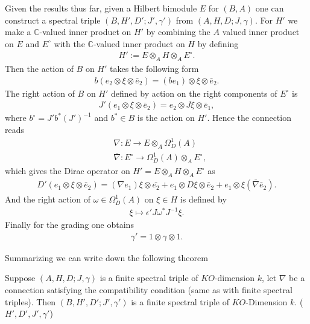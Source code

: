 Given the results thus far, given a Hilbert bimodule $E$ for $(B, A)$ one can
construct a spectral triple $(B, H', D'; J', \gamma ')$ from $(A, H, D; J,
\gamma)$. For $H'$ we make a $\mathbb{C}$-valued inner product on $H'$ by combining
the $A$ valued inner product on $E$ and $E^\circ$ with the
$\mathbb{C}$-valued inner product on $H$ by defining
\begin{align}
    H' := E\otimes _A H \otimes _A E^\circ.
\end{align}
Then the action of $B$ on $H'$ takes the following form
\begin{align}
    b(e_2 \otimes \xi \otimes \bar{e}_2 ) = (be_1) \otimes \xi \otimes
    \bar{e}_2.
\end{align}
The right action of $B$ on $H'$ defined by action on the right components of
$E^\circ$ is
\begin{align}
    J'(e_1 \otimes \xi \otimes \bar{e}_2) = e_2 \otimes J \xi \otimes
    \bar{e}_1,
\end{align}
where $b^\circ = J' b^* (J')^{-1}$ and $b^* \in B$ is the action on $H'$.
Hence the connection reads
\begin{align}
    &\nabla: E \rightarrow E\otimes _A \Omega _D ^1(A) \\
    &\bar{\nabla}:E^\circ \rightarrow \Omega _D^1(A) \otimes _A E^\circ,
\end{align}
which gives the Dirac operator on $H' = E \otimes _A H \otimes _A
E^\circ$ as
\begin{align}
    D'(e_1 \otimes \xi \otimes \bar{e}_2) = (\nabla e_1) \xi \otimes
    \bar{e_2}+ e_1 \otimes D\xi \otimes \bar{e}_2 + e_1 \otimes
    \xi(\bar{\nabla}\bar{e}_2).
\end{align}
And the right action of $\omega \in \Omega _D ^1(A)$ on $\xi \in H$ is
defined by
\begin{align}
    \xi \mapsto \epsilon' J \omega ^* J^{-1}\xi.
\end{align}
Finally for the grading one obtains
\begin{align}
    \gamma ' = 1 \otimes \gamma \otimes 1.
\end{align}

Summarizing we can write down the following theorem
\begin{mytheorem}
    Suppose $(A, H, D; J, \gamma)$ is a finite spectral triple of
    $KO$-dimension $k$, let $\nabla$ be a connection satisfying the
    compatibility condition (same as with finite spectral triples).
    Then $(B, H',D'; J', \gamma')$ is a finite spectral triple of
    $KO$-Dimension $k$. ($H', D', J', \gamma'$)
\end{mytheorem}

